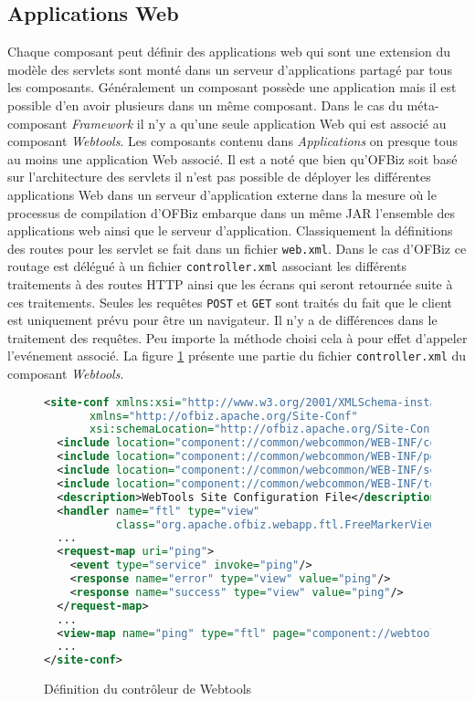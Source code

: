 \documentclass[a4paper, 11pt]{report}
\begin{document}
\subsection{Applications Web}

Chaque composant peut définir des applications web qui sont une
extension du modèle des servlets sont monté dans un serveur
d'applications partagé par tous les composants. Généralement un
composant possède une application mais il est possible d'en avoir
plusieurs dans un même composant.  Dans le cas du méta-composant
\emph{Framework} il n'y a qu'une seule application Web qui est associé
au composant \emph{Webtools}. Les composants contenu dans
\emph{Applications} on presque tous au moins une application Web
associé.  Il est a noté que bien qu'OFBiz soit basé sur l'architecture
des servlets il n'est pas possible de déployer les différentes
applications Web dans un serveur d'application externe dans la mesure
où le processus de compilation d'OFBiz embarque dans un même JAR
l'ensemble des applications web ainsi que le serveur d'application.
Classiquement la définitions des routes pour les servlet se fait dans
un fichier \verb=web.xml=.  Dans le cas d'OFBiz ce routage est délégué
à un fichier \verb=controller.xml= associant les différents
traitements à des routes HTTP ainsi que les écrans qui seront
retournée suite à ces traitements. Seules les requêtes \verb=POST= et
\verb=GET= sont traités du fait que le client est uniquement prévu
pour être un navigateur.  Il n'y a de différences dans le traitement
des requêtes.  Peu importe la méthode choisi cela à pour effet
d'appeler l'evénement associé.  La figure \ref{fig:controller}
présente une partie du fichier \verb=controller.xml= du composant
\emph{Webtools}.

\begin{figure}
  \begin{lstlisting}[language=xml]
<site-conf xmlns:xsi="http://www.w3.org/2001/XMLSchema-instance"
	   xmlns="http://ofbiz.apache.org/Site-Conf"
	   xsi:schemaLocation="http://ofbiz.apache.org/Site-Conf...">
  <include location="component://common/webcommon/WEB-INF/common-controller.xml"/>
  <include location="component://common/webcommon/WEB-INF/portal-controller.xml"/>
  <include location="component://common/webcommon/WEB-INF/security-controller.xml"/>
  <include location="component://common/webcommon/WEB-INF/tempexpr-controller.xml"/>
  <description>WebTools Site Configuration File</description>
  <handler name="ftl" type="view"
           class="org.apache.ofbiz.webapp.ftl.FreeMarkerViewHandler"/>
  ...
  <request-map uri="ping">
    <event type="service" invoke="ping"/>
    <response name="error" type="view" value="ping"/>
    <response name="success" type="view" value="ping"/>
  </request-map>
  ...
  <view-map name="ping" type="ftl" page="component://webtools/template/Ping.ftl"/>
  ...
</site-conf>
  \end{lstlisting}
  \caption{Définition du contrôleur de Webtools}
  \label{fig:controller}
\end{figure}
\end{document}
